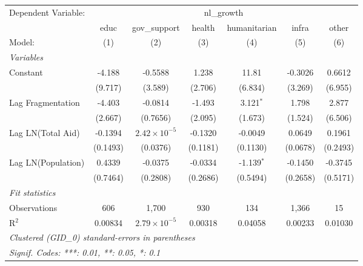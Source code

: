 \begingroup
\centering
\begin{tabular}{lcccccc}
   \tabularnewline \midrule \midrule
   Dependent Variable: & \multicolumn{6}{c}{nl\_growth}\\
                      & educ     & gov\_support          & health   & humanitarian & infra    & other \\   
   Model:             & (1)      & (2)                   & (3)      & (4)          & (5)      & (6)\\  
   \midrule
   \emph{Variables}\\
   Constant           & -4.188   & -0.5588               & 1.238    & 11.81        & -0.3026  & 0.6612\\   
                      & (9.717)  & (3.589)               & (2.706)  & (6.834)      & (3.269)  & (6.955)\\   
   Lag Fragmentation  & -4.403   & -0.0814               & -1.493   & 3.121$^{*}$  & 1.798    & 2.877\\   
                      & (2.667)  & (0.7656)              & (2.095)  & (1.673)      & (1.524)  & (6.506)\\   
   Lag LN(Total Aid)  & -0.1394  & $2.42\times 10^{-5}$  & -0.1320  & -0.0049      & 0.0649   & 0.1961\\   
                      & (0.1493) & (0.0376)              & (0.1181) & (0.1130)     & (0.0678) & (0.2493)\\   
   Lag LN(Population) & 0.4339   & -0.0375               & -0.0334  & -1.139$^{*}$ & -0.1450  & -0.3745\\   
                      & (0.7464) & (0.2808)              & (0.2686) & (0.5494)     & (0.2658) & (0.5171)\\   
   \midrule
   \emph{Fit statistics}\\
   Observations       & 606      & 1,700                 & 930      & 134          & 1,366    & 15\\  
   R$^2$              & 0.00834  & $2.79\times 10^{-5}$  & 0.00318  & 0.04058      & 0.00233  & 0.01030\\  
   \midrule \midrule
   \multicolumn{7}{l}{\emph{Clustered (GID\_0) standard-errors in parentheses}}\\
   \multicolumn{7}{l}{\emph{Signif. Codes: ***: 0.01, **: 0.05, *: 0.1}}\\
\end{tabular}
\par\endgroup



